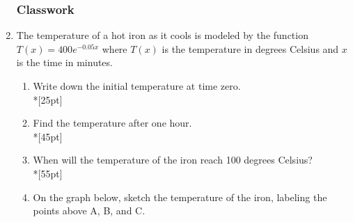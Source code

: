 \documentclass[]{book}
\begin{document}
\begin{enumerate}
\subsubsection{Classwork}

  \item The temperature of a hot iron as it cools is modeled by the function $T(x)=400e^{-0.05x}$ where $T(x)$ is the temperature in degrees Celsius and $x$ is the time in minutes.

  \begin{enumerate}
      \item Write down the initial temperature at time zero.\\*[25pt]
      \item Find the temperature after one hour.\\*[45pt]
      \item When will the temperature of the iron reach 100 degrees Celsius?\\*[55pt]
      \item On the graph below, sketch the temperature of the iron, labeling the points above A, B, and C.
  \end{enumerate}

  \begin{figure}[!htbp]
  \begin{center}
  \end{center}
  \end{figure}

\end{enumerate}
\end{document}
